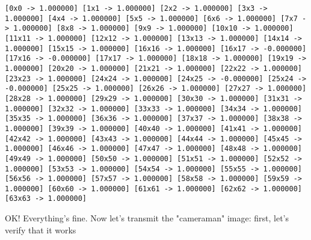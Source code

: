 \documentclass[11pt]{article}
\begin{document}
    \begin{Verbatim}[commandchars=\\\{\}]
[0x0 -> 1.000000] [1x1 -> 1.000000] [2x2 -> 1.000000] [3x3 -> 1.000000] [4x4 -> 1.000000] [5x5 -> 1.000000] [6x6 -> 1.000000] [7x7 -> 1.000000] [8x8 -> 1.000000] [9x9 -> 1.000000] [10x10 -> 1.000000] [11x11 -> 1.000000] [12x12 -> 1.000000] [13x13 -> 1.000000] [14x14 -> 1.000000] [15x15 -> 1.000000] [16x16 -> 1.000000] [16x17 -> -0.000000] [17x16 -> -0.000000] [17x17 -> 1.000000] [18x18 -> 1.000000] [19x19 -> 1.000000] [20x20 -> 1.000000] [21x21 -> 1.000000] [22x22 -> 1.000000] [23x23 -> 1.000000] [24x24 -> 1.000000] [24x25 -> -0.000000] [25x24 -> -0.000000] [25x25 -> 1.000000] [26x26 -> 1.000000] [27x27 -> 1.000000] [28x28 -> 1.000000] [29x29 -> 1.000000] [30x30 -> 1.000000] [31x31 -> 1.000000] [32x32 -> 1.000000] [33x33 -> 1.000000] [34x34 -> 1.000000] [35x35 -> 1.000000] [36x36 -> 1.000000] [37x37 -> 1.000000] [38x38 -> 1.000000] [39x39 -> 1.000000] [40x40 -> 1.000000] [41x41 -> 1.000000] [42x42 -> 1.000000] [43x43 -> 1.000000] [44x44 -> 1.000000] [45x45 -> 1.000000] [46x46 -> 1.000000] [47x47 -> 1.000000] [48x48 -> 1.000000] [49x49 -> 1.000000] [50x50 -> 1.000000] [51x51 -> 1.000000] [52x52 -> 1.000000] [53x53 -> 1.000000] [54x54 -> 1.000000] [55x55 -> 1.000000] [56x56 -> 1.000000] [57x57 -> 1.000000] [58x58 -> 1.000000] [59x59 -> 1.000000] [60x60 -> 1.000000] [61x61 -> 1.000000] [62x62 -> 1.000000] [63x63 -> 1.000000] 
    \end{Verbatim}

    OK! Everything's fine. Now let's transmit the "cameraman" image: first,
let's verify that it works
\end{document}
